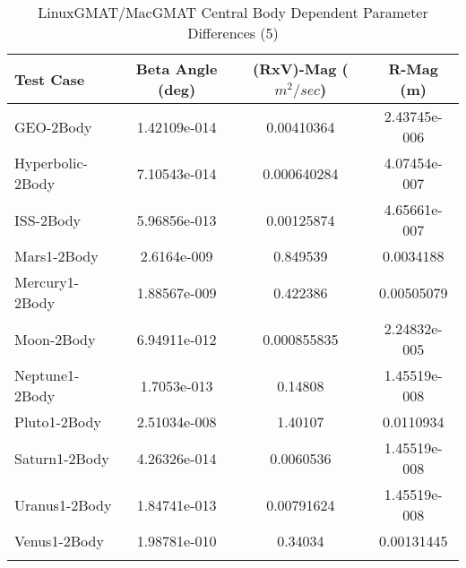 \begin{table}[htbp!]
\centering
\caption{ LinuxGMAT/MacGMAT Central Body Dependent Parameter Differences (5)}
      \begin{tabular}{lccc}
      \hline\hline
          Test Case & Beta Angle (deg) & (RxV)-Mag ($m^2/sec$) & R-Mag (m) \\
         \hline
         GEO-2Body & 1.42109e-014 & 0.00410364 & 2.43745e-006 \\
         Hyperbolic-2Body & 7.10543e-014 & 0.000640284 & 4.07454e-007 \\
         ISS-2Body & 5.96856e-013 & 0.00125874 & 4.65661e-007 \\
         Mars1-2Body & 2.6164e-009 & 0.849539 & 0.0034188 \\
         Mercury1-2Body & 1.88567e-009 & 0.422386 & 0.00505079 \\
         Moon-2Body & 6.94911e-012 & 0.000855835 & 2.24832e-005 \\
         Neptune1-2Body & 1.7053e-013 & 0.14808 & 1.45519e-008 \\
         Pluto1-2Body & 2.51034e-008 & 1.40107 & 0.0110934 \\
         Saturn1-2Body & 4.26326e-014 & 0.0060536 & 1.45519e-008 \\
         Uranus1-2Body & 1.84741e-013 & 0.00791624 & 1.45519e-008 \\
         Venus1-2Body & 1.98781e-010 & 0.34034 & 0.00131445 \\
      \hline\hline
      \label{Table: LinuxGMAT-MacGMAT CB Parameters Set 5} 
\end{tabular}
\end{table}

